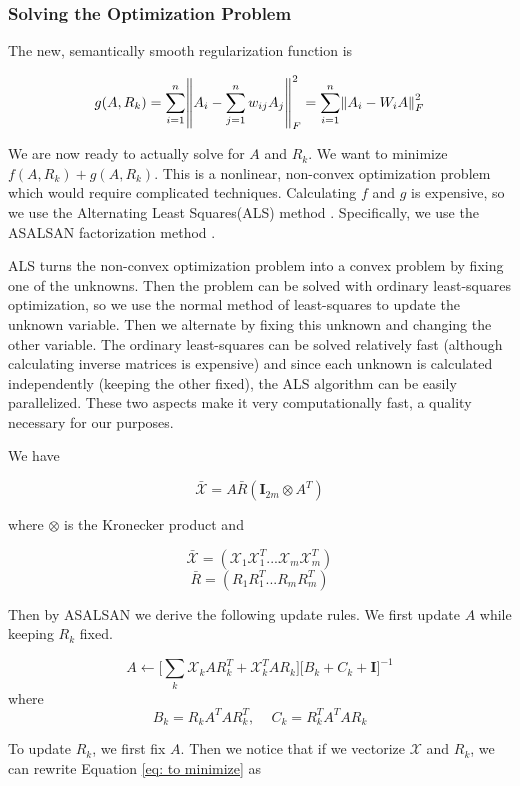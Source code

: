 \documentclass[pageno]{final_paper}
\begin{document}
\subsubsection{Solving the Optimization Problem}
\label{Solving the Optimization Problem}

The new, semantically smooth regularization function is

\begin{equation}
    \label{eq: new g}
    g(A, R_k) = \sum_{i=1}^n \norm{A_i - \sum_{j=1}^n w_{ij}A_j}_F^2 =
    \sum_{i=1}^n \norm{A_i - W_iA}_F^2
\end{equation}

We are now ready to actually solve for $A$ and $R_k$. We want to minimize $f(A,
R_k) + g(A, R_k)$. This is a nonlinear, non-convex optimization problem which
would require complicated techniques. Calculating $f$ and $g$ is expensive, so
we use the Alternating Least Squares(ALS) method \cite{Koren2009}. Specifically,
we use the ASALSAN factorization method \cite{Bader2007}.

ALS turns the non-convex optimization problem into a convex problem by fixing
one of the unknowns. Then the problem can be solved with ordinary least-squares
optimization, so we use the normal method of least-squares to update the unknown
variable. Then we alternate by fixing this unknown and changing the other
variable. The ordinary least-squares can be solved relatively fast (although
calculating inverse matrices is expensive) and since each unknown is calculated
independently (keeping the other fixed), the ALS algorithm can be easily
parallelized. These two aspects make it very computationally fast, a quality
necessary for our purposes.

We have

$$\bar{\mathcal{X}} = A\bar{R}(\mathbf{I}_{2m} \otimes A^T)$$

where $\otimes$ is the Kronecker product and

$$\bar{\mathcal{X}} = \left( \mathcal{X}_1\mathcal{X}_1^T ... \mathcal{X}_m\mathcal{X}_m^T \right)$$
$$\bar{R} = \left( R_1 R_1^T ... R_mR_m^T \right)$$

Then by ASALSAN we derive the following update rules. We first update $A$ while
keeping $R_k$ fixed.

$$A \leftarrow \bigg[ \sum_k \mathcal{X}_kAR_k^T + \mathcal{X}_k^TAR_k \bigg] \bigg[ B_k + C_k + \mathbf{I} \bigg]^{-1}$$
where
$$B_k = R_k A^T AR_k^T,\,\,\,\,\,\,\, C_k = R_k^TA^TAR_k$$

To update $R_k$, we first fix $A$. Then we notice that if we vectorize
$\mathcal{X}$ and $R_k$, we can rewrite Equation \ref{eq: to minimize} as
\end{document}
